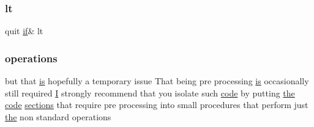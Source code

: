 \mbox{\label{ufpp__overview_81_8txt_a1bf2b9c519ae0b6e5f5b9f0a3866a054}} 
\subsubsection{\texorpdfstring{lt}{lt}}
{\footnotesize\ttfamily quit \hyperlink{exit_87_8txt_a77395982f8d25581c808c40f3b634d90}{if}\& lt}

\mbox{\label{ufpp__overview_81_8txt_acc0f1fb4c8f484f4433c4e896cb04db7}} 
\subsubsection{\texorpdfstring{operations}{operations}}
{\footnotesize\ttfamily but that \hyperlink{intro__blas1_83_8txt_a42a91df93f840595de3019ceb5d1df23}{is} hopefully a temporary issue That being pre processing \hyperlink{intro__blas1_83_8txt_a42a91df93f840595de3019ceb5d1df23}{is} occasionally still required \hyperlink{continue_87_8txt_ae7b8826453d28f1bdb2fba7e889eb23b}{I} strongly recommend that you isolate such \hyperlink{ufpp__overview_81_8txt_a74a0615f2d9c4a398d9126096f8092f8}{code} by putting \hyperlink{M__stopwatch_83_8txt_a0f266597de2e57eb3aa964927bb30e14}{the} \hyperlink{ufpp__overview_81_8txt_a74a0615f2d9c4a398d9126096f8092f8}{code} \hyperlink{intro__blas1_83_8txt_aa06cca0b542e18027a508f939187fc96}{sections} that require pre processing into small procedures that perform just \hyperlink{M__stopwatch_83_8txt_a0f266597de2e57eb3aa964927bb30e14}{the} non standard operations}

\mbox{\label{ufpp__overview_81_8txt_a14371501a41ff61714dd3fd8734de5a0}} 
